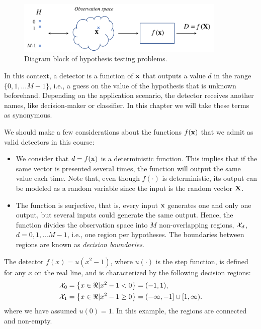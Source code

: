 \begin{figure}
\begin{center}
\includegraphics[width=10cm]{Figures//classification_overview.png}
\end{center}
\caption{Diagram block of hypothesis testing problems.\label{fig:clas_overview}}
\end{figure}

In this context, a detector is a function of $\bf x$ that outputs a value $d$ in the range $\{0, 1, \ldots M-1\}$, i.e., a guess on the value of the hypothesis that is unknown beforehand. Depending on the application scenario, the detector receives another names, like decision-maker or classifier. In this chapter we will take these terms as synonymous.

We should make a few considerations about the functions $f({\bf x})$ that we admit as valid detectors in this course:

\begin{itemize}
\item We consider that $d = f({\bf x})$ is a deterministic function. This implies that if the same vector is presented several times, the function will output the same value each time. Note that, even though $f(\cdot)$ is deterministic, its output can be modeled as a random variable since the input is the random vector $\bf X$.
\item The function is surjective, that is, every input ${\bf x}$ generates one and only one output, but several inputs could generate the same output. Hence, the function divides the observation space into $M$ non-overlapping regions, ${\cal X}_d$, $d = 0, 1, \ldots M-1$, i.e., one region per hypotheses. The boundaries between regions are known as \textit{decision boundaries}.
\end{itemize}

\begin{example}
The detector $f(x) = u(x^2 -1)$, where $u(\cdot)$ is the step function, is defined for any $x$ on the real line, and is characterized by the following decision regions:
\begin{align}{\cal X}_0 & = \left\{ x \in \Re | x^2-1 < 0\right\} = (-1,1), \nonumber\\
{\cal X}_1 & = \left\{ x \in \Re | x^2-1 \geq 0\right\} = (-\infty,-1] \cup [1,\infty). \nonumber
\end{align}
where we have assumed $u(0)=1$. In this example, the regions are connected and non-empty.
\end{example}

